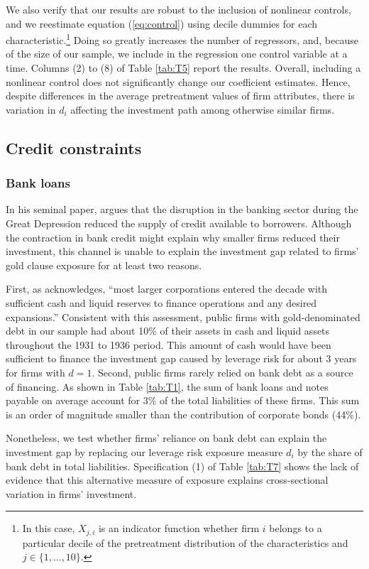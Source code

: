 We also verify that our results are robust to the inclusion of nonlinear controls, and we reestimate equation (\ref{eq:control}) using decile dummies for each characteristic.\footnote{In this case, $X_{j,i}$ is an indicator function whether firm $i$ belongs to a particular decile of the pretreatment distribution of the characteristics and $j \in \{1,..., 10\}$.} Doing so greatly increases the number of regressors, and, because of the size of our sample, we include in the regression one control variable at a time. Columns (2) to (8) of Table \ref{tab:T5} report the results. Overall, including a nonlinear control does not significantly change our coefficient estimates. Hence, despite differences in the average pretreatment values of firm attributes, there is variation in $d_i$ affecting the investment path among otherwise similar firms.

\subsection{Credit constraints}
\subsubsection{Bank loans}
In his seminal paper, \cite{Bernanke1983} argues that the disruption in the banking sector during the Great Depression reduced the supply of credit available to borrowers. Although the contraction in bank credit might explain why smaller firms reduced their investment, this channel is unable to explain the investment gap related to firms' gold clause exposure for at least two reasons.

First, as \cite{Bernanke1983} acknowledges, ``most larger corporations entered the decade with sufficient cash and liquid reserves to finance operations and any desired expansions.'' Consistent with this assessment, public firms with gold-denominated debt in our sample had about 10\% of their assets in cash and liquid assets throughout the 1931 to 1936 period. This amount of cash would have been sufficient to finance the investment gap caused by leverage risk for about 3 years for firms with $d = 1$. Second, public firms rarely relied on bank debt as a source of financing. As shown in Table \ref{tab:T1}, the sum of bank loans and notes payable on average account for 3\% of the total liabilities of these firms. This sum is an order of magnitude smaller than the contribution of corporate bonds (44\%). 

Nonetheless, we test whether firms' reliance on bank debt can explain the investment gap by replacing our leverage risk exposure measure $d_i$ by the share of bank debt in total liabilities. Specification (1) of Table \ref{tab:T7} shows the lack of evidence that this alternative measure of exposure explains cross-sectional variation in firms' investment.

